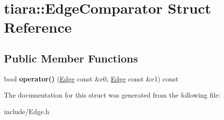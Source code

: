 \hypertarget{structtiara_1_1EdgeComparator}{}\section{tiara\+::Edge\+Comparator Struct Reference}
\label{structtiara_1_1EdgeComparator}
\subsection*{Public Member Functions}
\begin{DoxyCompactItemize}
\item 
\mbox{\label{structtiara_1_1EdgeComparator_adcc8066e5d68cbd59db1ecd841c40877}} 
bool {\bfseries operator()} (\mbox{\hyperlink{classtiara_1_1Edge}{Edge}} const \&e0, \mbox{\hyperlink{classtiara_1_1Edge}{Edge}} const \&e1) const
\end{DoxyCompactItemize}


The documentation for this struct was generated from the following file\+:\begin{DoxyCompactItemize}
\item 
include/Edge.\+h\end{DoxyCompactItemize}
